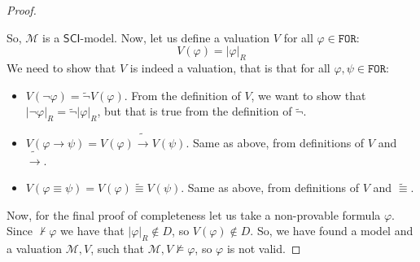 \documentclass{article}
\theoremstyle{definition}
\theoremstyle{definition}
\theoremstyle{definition}
\theoremstyle{definition}
\theoremstyle{definition}
\newcommand*{\id}{\equiv}
\newcommand*{\ra}{\rightarrow}
\newcommand*{\FOR}{\texttt{FOR}}
\newcommand{\SCI}{$\mathsf{SCI}$\xspace}
\begin{document}
\begin{proof}
\begin{itemize}
    \end{itemize}
    So, $\mathcal{M}$ is a \SCI-model. Now, let us define a valuation $V$ for all
    $\varphi \in \FOR$: $$ V(\varphi) = |\varphi|_R $$
    We need to show that $V$ is indeed a valuation, that is that for all $\varphi,
        \psi \in \FOR$:
    \begin{itemize}
        \item $V(\lnot \varphi) = \tilde{\lnot}V(\varphi)$. From the definition of $V$, we want to show that $|\lnot \varphi|_R = \tilde{\lnot}|\varphi|_R$, but that is true from the definition of $\tilde{\lnot}$.
        \item $V(\varphi \ra \psi) = V(\varphi) \tilde{\ra} V(\psi)$. Same as above, from definitions of $V$ and $\tilde{\ra}$.
        \item $V(\varphi \id \psi) = V(\varphi) \tilde{\id} V(\psi)$. Same as above, from definitions of $V$ and $\tilde{\id}$.
    \end{itemize}
    Now, for the final proof of completeness let us take a non-provable formula
    $\varphi$. Since $\not \vdash \varphi$ we have that $|\varphi|_R \not \in D$,
    so $V(\varphi) \not \in D$. So, we have found a model and a valuation
    $\mathcal{M},V$, such that $\mathcal{M},V \not \models \varphi$, so $\varphi$
    is not valid.
\end{proof}
\end{document}
